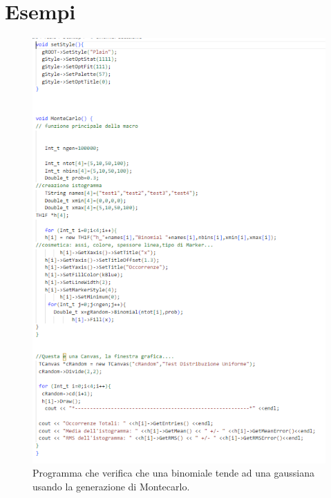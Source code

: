 \documentclass[10pt,a4paper]{article}
\begin{document}
\section{Esempi}
\begin{figure}[h!]
	\centering
	\includegraphics[width=0.8\linewidth]{"Screenshot 2022-06-06 212045"}
	\caption{Programma che verifica che una binomiale tende ad una gaussiana usando la generazione di Montecarlo.}
	\label{fig:screenshot-2022-06-06-212045}
\end{figure}
\end{document}
